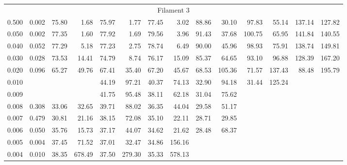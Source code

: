 \begin{tabular}{@{}lrrrrrrrrrrrrr@{}}
\midrule
\multicolumn{14}{c}{Filament 3} \\
\cmidrule{1-14}
0.500 & 0.002 & 75.80 &   1.68 & 75.97 &   1.77 & 77.45 &   3.02 & 88.86 &  30.10 & 97.83 & 55.14 & 137.14 & 127.82 \\
0.050 & 0.002 & 77.35 &   1.60 & 77.92 &   1.69 & 79.56 &   3.96 & 91.43 &  37.68 & 100.75 & 65.95 & 141.84 & 140.55 \\
0.040 & 0.052 & 77.29 &   5.18 & 77.23 &   2.75 & 78.74 &   6.49 & 90.00 &  45.96 & 98.93 & 75.91 & 138.74 & 149.81 \\
0.030 & 0.028 & 73.53 &  14.41 & 74.79 &   8.74 & 76.17 &  15.09 & 85.37 &  64.65 & 93.10 & 96.88 & 128.39 & 167.20 \\
0.020 & 0.096 & 65.27 &  49.76 & 67.41 &  35.40 & 67.20 &  45.67 & 68.53 & 105.36 & 71.57 & 137.43 & 88.48 & 195.79 \\
0.010 &       &       &        & 44.19 &  97.21 & 40.37 &  74.13 & 32.90 &  94.18 & 31.44 & 125.24 &       &            \\
0.009 &       &       &        & 41.75 &  95.48 & 38.11 &  62.18 & 31.04 &  75.62 &       &            &       &            \\
0.008 & 0.308 & 33.06 &  32.65 & 39.71 &  88.02 & 36.35 &  44.04 & 29.58 &  51.17 &       &            &       &            \\
0.007 & 0.479 & 30.81 &  21.16 & 38.15 &  72.08 & 35.10 &  22.11 & 28.71 &  29.85 &       &            &       &            \\
0.006 & 0.050 & 35.76 &  15.73 & 37.17 &  44.07 & 34.62 &  21.62 & 28.48 &  68.37 &       &            &       &            \\
0.005 & 0.004 & 37.45 &  71.52 & 37.01 &  32.47 & 34.86 & 156.16 &       &        &       &            &       &            \\
0.004 & 0.010 & 38.35 & 678.49 & 37.50 & 279.30 & 35.33 & 578.13 &       &        &       &            &       &            \\


\end{tabular}
